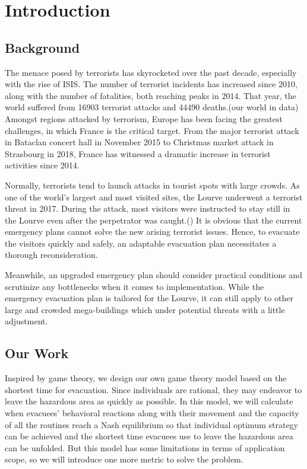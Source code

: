 \documentclass{mcmthesis}
\begin{document}
	\maketitle                  %
	
	\tableofcontents
	\newpage
	
	\section{Introduction}
	\subsection{Background}
	
	The menace posed by terrorists has skyrocketed over the past decade, especially with the rise of ISIS.  The number of terrorist incidents has increased since 2010, along with the number of fatalities, both reaching peaks in 2014. That year, the world suffered from 16903 terrorist attacks and 44490 deaths.(our world in data) Amongst regions attacked by terrorism, Europe has been facing the greatest challenges, in which France is the critical target. From the major terrorist attack in Bataclan concert hall in November 2015 to Christmas market attack in Strasbourg in 2018, France has witnessed a dramatic increase in terrorist activities since 2014.
	
	Normally, terrorists tend to launch attacks in tourist spots with large crowds. As one of the world's largest and most visited sites, the Lourve underwent a terrorist threat in 2017. During the attack, most visitors were instructed to stay still in the Lourve even after the perpetrator was caught.() It is obvious that the current emergency plans cannot solve the new arising terrorist issues. Hence, to evacuate the visitors quickly and safely, an adaptable evacuation plan necessitates a thorough reconsideration. 
	
	Meanwhile, an upgraded emergency plan should consider practical conditions and scrutinize any bottlenecks when it comes to implementation. While the emergency evacuation plan is tailored for the Lourve, it can still apply to other large and crowded mega-buildings which under potential threats with a little adjustment.
	
	
	\subsection{Our Work}
	Inspired by game theory, we design our own game theory model based on the shortest time for evacuation. Since individuals are rational, they may endeavor to leave the hazardous area as quickly as possible. In this model, we will calculate when evacuees’ behavioral reactions along with their movement and the capacity of all the routines reach a Nash equilibrium so that individual optimum strategy can be achieved and the shortest time evacuees use to leave the hazardous area can be unfolded. But this model has some limitations in terms of application scope, so we will introduce one more metric to solve the problem.
	
\end{document}
